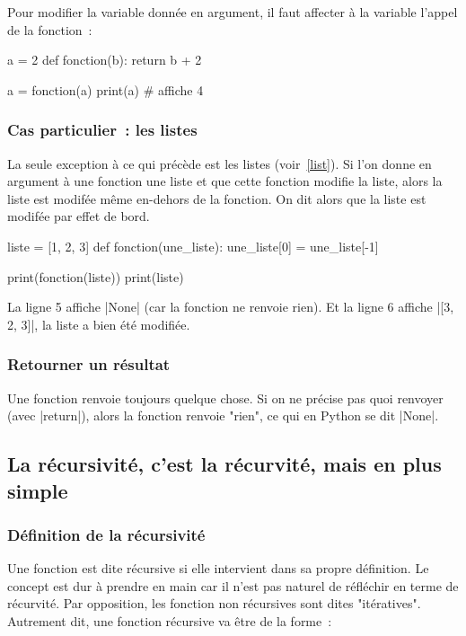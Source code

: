 		Pour modifier la variable donnée en argument, il faut affecter à la variable l'appel de la fonction~:
		
		\begin{pythoncode}
			a = 2
			def fonction(b):
				return b + 2
			
			a = fonction(a)
			print(a) # affiche 4
		\end{pythoncode}
		
		\subsubsection{Cas particulier~: les listes}
		La seule exception à ce qui précède est les listes (voir~\ref{list}). Si l'on donne en argument à une fonction une liste et que cette fonction modifie la liste, alors la liste est modifée même en-dehors de la fonction. On dit alors que la liste est modifée par effet de bord.
		
		\begin{pythoncode}
			liste = [1, 2, 3]
			def fonction(une_liste):
				une_liste[0] = une_liste[-1]
			
			print(fonction(liste))
			print(liste)
		\end{pythoncode}
		
		La ligne 5 affiche \python|None| (car la fonction ne renvoie rien). Et la ligne 6 affiche \python|[3, 2, 3]|, la liste a bien été modifiée.
	
		\subsubsection{Retourner un résultat}
		Une fonction renvoie toujours quelque chose. Si on ne précise pas quoi renvoyer (avec \python|return|), alors la fonction renvoie "rien", ce qui en Python se dit \python|None|.
	
	\subsection{La récursivité, c'est la récurvité, mais en plus simple}
		
		\subsubsection{Définition de la récursivité}
		Une fonction est dite récursive si elle intervient dans sa propre définition. Le concept est dur à prendre en main car il n'est pas naturel de réfléchir en terme de récurvité. Par opposition, les fonction non récursives sont dites "itératives". Autrement dit, une fonction récursive va être de la forme~:
		
